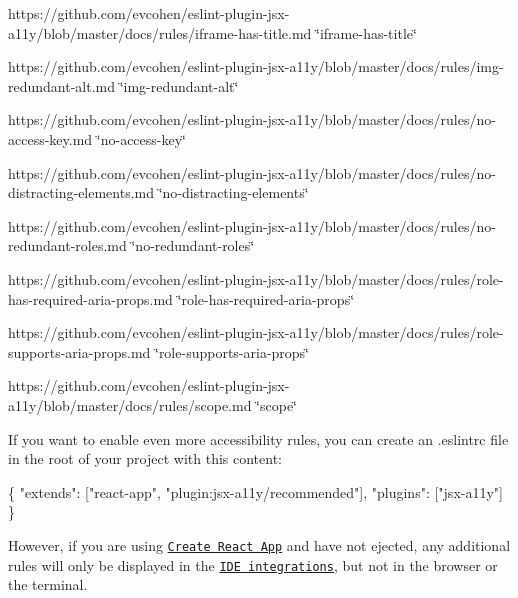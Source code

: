 \begin{DoxyItemize}
\item https\+://github.com/evcohen/eslint-\/plugin-\/jsx-\/a11y/blob/master/docs/rules/iframe-\/has-\/title.\+md \char`\"{}iframe-\/has-\/title\char`\"{}
\item https\+://github.com/evcohen/eslint-\/plugin-\/jsx-\/a11y/blob/master/docs/rules/img-\/redundant-\/alt.\+md \char`\"{}img-\/redundant-\/alt\char`\"{}
\item https\+://github.com/evcohen/eslint-\/plugin-\/jsx-\/a11y/blob/master/docs/rules/no-\/access-\/key.\+md \char`\"{}no-\/access-\/key\char`\"{}
\item https\+://github.com/evcohen/eslint-\/plugin-\/jsx-\/a11y/blob/master/docs/rules/no-\/distracting-\/elements.\+md \char`\"{}no-\/distracting-\/elements\char`\"{}
\item https\+://github.com/evcohen/eslint-\/plugin-\/jsx-\/a11y/blob/master/docs/rules/no-\/redundant-\/roles.\+md \char`\"{}no-\/redundant-\/roles\char`\"{}
\item https\+://github.com/evcohen/eslint-\/plugin-\/jsx-\/a11y/blob/master/docs/rules/role-\/has-\/required-\/aria-\/props.\+md \char`\"{}role-\/has-\/required-\/aria-\/props\char`\"{}
\item https\+://github.com/evcohen/eslint-\/plugin-\/jsx-\/a11y/blob/master/docs/rules/role-\/supports-\/aria-\/props.\+md \char`\"{}role-\/supports-\/aria-\/props\char`\"{}
\item https\+://github.com/evcohen/eslint-\/plugin-\/jsx-\/a11y/blob/master/docs/rules/scope.\+md \char`\"{}scope\char`\"{}
\end{DoxyItemize}

If you want to enable even more accessibility rules, you can create an {\ttfamily .eslintrc} file in the root of your project with this content\+:


\begin{DoxyCode}
\{
  "extends": ["react-app", "plugin:jsx-a11y/recommended"],
  "plugins": ["jsx-a11y"]
\}
\end{DoxyCode}


However, if you are using \href{https://github.com/facebookincubator/create-react-app}{\tt Create React App} and have not ejected, any additional rules will only be displayed in the \href{https://github.com/facebookincubator/create-react-app/blob/master/packages/react-scripts/template/README.md#displaying-lint-output-in-the-editor}{\tt I\+DE integrations}, but not in the browser or the terminal. 